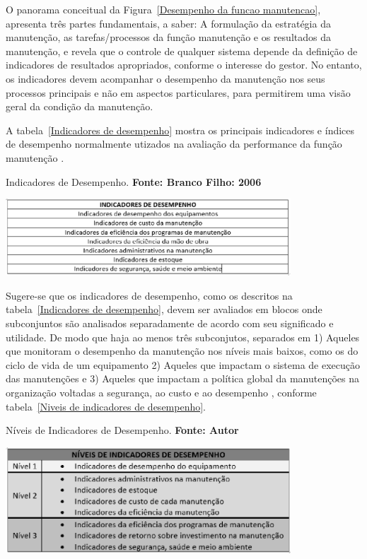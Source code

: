 O panorama conceitual da Figura~\ref{Desempenho da funcao manutencao}, apresenta três partes fundamentais, a saber: A formulação da estratégia da manutenção, as tarefas/processos da função manutenção e os resultados da manutenção, e revela que o controle de qualquer sistema depende da definição de indicadores de resultados apropriados, conforme o interesse do gestor. No entanto, os indicadores devem acompanhar o desempenho da manutenção nos seus processos principais e não em aspectos particulares, para permitirem uma visão geral da condição da manutenção.

A tabela~\ref{Indicadores de desempenho} mostra os principais indicadores e índices de desempenho normalmente utizados na avaliação da performance da função manutenção \cite{branco2006indicadores}.

\graphicspath{{figuras/}}	
\begin{table}[H]
\centering
\caption{Indicadores de Desempenho. \textbf{Fonte: Branco Filho: 2006}}
\includegraphics[width=0.8\textwidth]{IndicadoresBrancoFilho.eps}
\label{Indicadores de desempenho}
\end{table}

Sugere-se que os indicadores de desempenho, como os descritos na tabela~\ref{Indicadores de desempenho}, devem ser avaliados em blocos onde subconjuntos são analisados separadamente de acordo com seu significado e utilidade. De modo que haja ao menos três subconjutos, separados em 1) Aqueles que monitoram o desempenho da manutenção nos níveis mais baixos, como os do ciclo de vida de um equipamento 2) Aqueles que impactam o sistema de execução das manutenções e 3) Aqueles que impactam a política global da manutenções na organização voltadas a segurança, ao custo e ao desempenho \cite{de2012indicadores}, conforme tabela~\ref{Niveis de indicadores de desempenho}.

\graphicspath{{figuras/}}
\begin{table}[H]
\centering
\caption{Níveis de Indicadores de Desempenho. \textbf{Fonte: Autor}}
\includegraphics[width=0.8\textwidth]{niveisdeindicadores.eps}
\label{Niveis de indicadores de desempenho}
\end{table}

